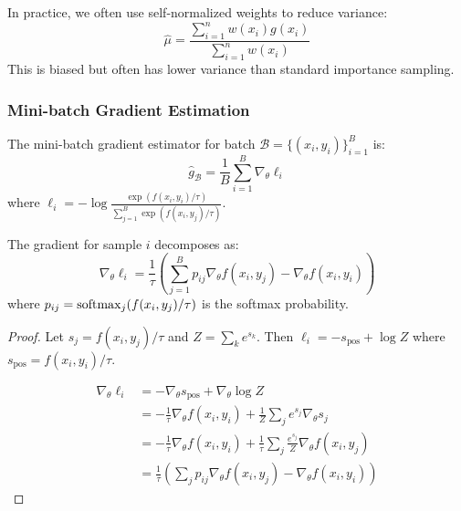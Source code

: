 \begin{notechapter}
\begin{remark}
In practice, we often use self-normalized weights to reduce variance:
\begin{equation}
\hat{\mu} = \frac{\sum_{i=1}^n w(x_i) g(x_i)}{\sum_{i=1}^n w(x_i)}
\end{equation}
This is biased but often has lower variance than standard importance sampling.
\end{remark}

\subsubsection{Mini-batch Gradient Estimation}

\begin{definition}
The mini-batch gradient estimator for batch $\mathcal{B} = \{(x_i, y_i)\}_{i=1}^B$ is:
\begin{equation}
\hat{g}_{\mathcal{B}} = \frac{1}{B} \sum_{i=1}^{B} \nabla_\theta \ell_i
\end{equation}
where $\ell_i = -\log \frac{\exp(f(x_i, y_i)/\tau)}{\sum_{j=1}^{B} \exp(f(x_i, y_j)/\tau)}$.
\end{definition}

\begin{proposition}
The gradient for sample $i$ decomposes as:
\begin{equation}
\nabla_\theta \ell_i = \frac{1}{\tau}\left(\sum_{j=1}^{B} p_{ij} \nabla_\theta f(x_i, y_j) - \nabla_\theta f(x_i, y_i)\right)
\end{equation}
where $p_{ij} = \mathrm{softmax}_j(f(x_i, y_j)/\tau)$ is the softmax probability.
\end{proposition}

\begin{proof}
Let $s_j = f(x_i, y_j)/\tau$ and $Z = \sum_k e^{s_k}$. Then $\ell_i = -s_{\text{pos}} + \log Z$ where $s_{\text{pos}} = f(x_i, y_i)/\tau$.

\begin{align}
\nabla_\theta \ell_i &= -\nabla_\theta s_{\text{pos}} + \nabla_\theta \log Z \\
&= -\frac{1}{\tau}\nabla_\theta f(x_i, y_i) + \frac{1}{Z} \sum_j e^{s_j} \nabla_\theta s_j \\
&= -\frac{1}{\tau}\nabla_\theta f(x_i, y_i) + \frac{1}{\tau}\sum_j \frac{e^{s_j}}{Z} \nabla_\theta f(x_i, y_j) \\
&= \frac{1}{\tau}\left(\sum_j p_{ij} \nabla_\theta f(x_i, y_j) - \nabla_\theta f(x_i, y_i)\right)
\end{align}
\end{proof}


\end{notechapter}
